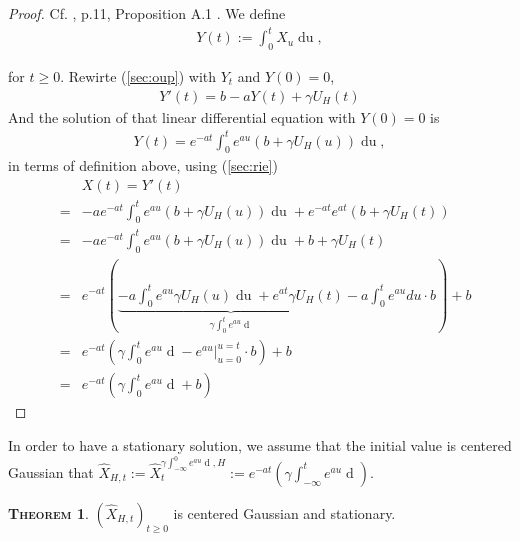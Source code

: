 \documentclass[a4paper, twoside, 11pt]{article}
\theoremstyle{definition}
\newtheorem{theorem}[definition]{\scshape Theorem}
\newcommand{\brkt}[1]{\left({#1} \right)}
\begin{document}
\begin{proof}
  Cf. \cite{chriel}, p.11, Proposition A.1 . We define
  \begin{eqnarray*}
	Y(t):=\int_0^t X_u \mathop{du},
  \end{eqnarray*}
 
 for $t\ge 0$. Rewirte (\ref{sec:oup}) with $Y_t$ and $Y(0)=0$,
  \begin{eqnarray*}
	Y'(t) = b - aY(t) + \gamma U_H(t)
  \end{eqnarray*}
  And the solution of that linear differential equation with $Y(0)=0$ is
  \begin{eqnarray*}
	Y(t) = e^{-at}\int_0^t e^{au}(b+\gamma U_H(u)) \mathop{du},
  \end{eqnarray*}
  in terms of definition above, using (\ref{sec:rie})
	\begin{eqnarray*}
	&&X(t) =  Y'(t)\\
	&=& -ae^{-at}\int_0^t e^{au}(b+\gamma U_H(u)) \mathop{du} + e^{-at}e^{at}(b+\gamma U_H(t)) \\
	&=&  -ae^{-at}\int_0^t e^{au}(b+\gamma U_H(u)) \mathop{du} + b +\gamma U_H(t)\\
	&=& e^{-at} \brkt{\underbrace{-a\int_0^t e^{au} \gamma U_H(u) \mathop{du} + e^{at}\gamma U_H(t)}_{\gamma\int_0^t e^{au} \mathop{dU_H(u)}} -a\int_0^t e^{au} du \cdot b } + b\\
  &=&  e^{-at} \brkt{\gamma\int_0^t e^{au} \mathop{dU_H(u)} - e^{au}|^{u=t}_{u=0} \cdot b } + b\\
  &=&  e^{-at} \brkt{\gamma\int_0^t e^{au} \mathop{dU_H(u)} + b}
	\end{eqnarray*}
\end{proof}

In order to have a stationary solution, we assume that the initial value is centered Gaussian that $\hat{X}_{H,t}:= \hat{X}_t^{\gamma\int_{-\infty}^0 e^{au}\mathop{dU_H(u)}, H} := e^{-at}\brkt{\gamma\int_{-\infty}^t e^{au}\mathop{dU_H(u)}}$.
\begin{theorem}
  $(\hat{X}_{H,t})_{t\ge 0}$ is centered Gaussian and stationary.
  \label{sec:gsp}
\end{theorem}
\end{document}
